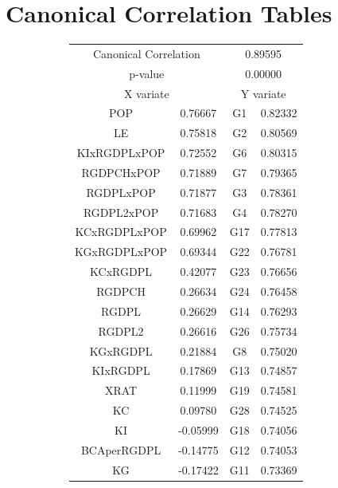 \chapter{Canonical Correlation Tables}





\begin{figure}[H]
  \begin{subfigure}{.7\textwidth}
  \centering
  \begin{tabular}{ c c | c c }
    \multicolumn{2}{c}{Canonical Correlation} &  \multicolumn{2}{c}{0.89595} \\
    \multicolumn{2}{c}{p-value} &  \multicolumn{2}{c}{0.00000} \\
    \hline
    \multicolumn{2}{c}{X variate} & \multicolumn{2}{c}{Y variate}\\
    \hline
  POP & 0.76667 &  G1 & 0.82332\\
  LE & 0.75818 &  G2 & 0.80569\\
  KIxRGDPLxPOP & 0.72552 &  G6 & 0.80315\\
  RGDPCHxPOP & 0.71889 &  G7 & 0.79365\\
  RGDPLxPOP & 0.71877 &  G3 & 0.78361\\
  RGDPL2xPOP & 0.71683 &  G4 & 0.78270\\
  KCxRGDPLxPOP & 0.69962 &  G17 & 0.77813\\
  KGxRGDPLxPOP & 0.69344 &  G22 & 0.76781\\
  KCxRGDPL & 0.42077 &  G23 & 0.76656\\
  RGDPCH & 0.26634 &  G24 & 0.76458\\
  RGDPL & 0.26629 &  G14 & 0.76293\\
  RGDPL2 & 0.26616 &  G26 & 0.75734\\
  KGxRGDPL & 0.21884 &  G8 & 0.75020\\
  KIxRGDPL & 0.17869 &  G13 & 0.74857\\
  XRAT & 0.11999 &  G19 & 0.74581\\
  KC & 0.09780 &  G28 & 0.74525\\
  KI & -0.05999 &  G18 & 0.74056\\
  BCAperRGDPL & -0.14775 &  G12 & 0.74053\\
  KG & -0.17422 &  G11 & 0.73369\\

\end{tabular}
\end{subfigure}
\end{figure}
